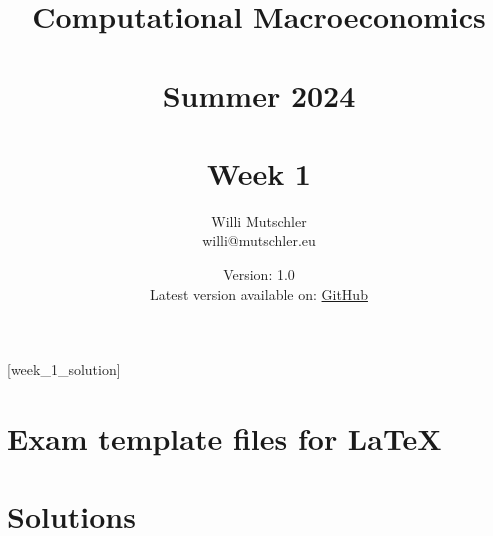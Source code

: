 
\newif\ifDisplaySolutions\DisplaySolutionstrue%


\title{Computational Macroeconomics\\~\\Summer 2024\\~\\Week 1}
\author{Willi Mutschler\\willi@mutschler.eu}
\date{Version: 1.0\\Latest version available on: \href{https://github.com/wmutschl/Computational-Macroeconomics/releases/latest/download/week_1.pdf}{GitHub}}
\maketitle\thispagestyle{empty}

\newpage
{}[week_1_solution]
\tableofcontents\thispagestyle{empty}\newpage

\setcounter{page}{1}
\newpage
\newpage
\newpage
\newpage
\newpage
\printbibliography%
\newpage
\appendix
\section{Exam template files for \LaTeX}





\ifDisplaySolutions%
\newpage
\section{Solutions}

\fi
